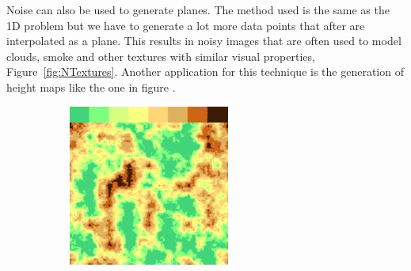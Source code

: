 Noise can also be used to generate planes. The method used is the same as the 1D problem but we have to generate a lot more data points that after are interpolated as a plane. This results in noisy images that are often used to model clouds, smoke and other textures with similar visual properties, Figure~\ref{fig:NTextures}. Another application for this technique is the generation of height maps like the one in figure .

\begin{figure}
        \centering
        \begin{subfigure}[b]{0.3\textwidth}
                \includegraphics[width=\textwidth]{img/Theory/Perlin_Noise/gradient_discrete.png}
                \label{fig:Fleaf}
        \end{subfigure}%
        ~ %
        \begin{subfigure}[b]{0.3\textwidth}

\end{subfigure}
\end{figure}
